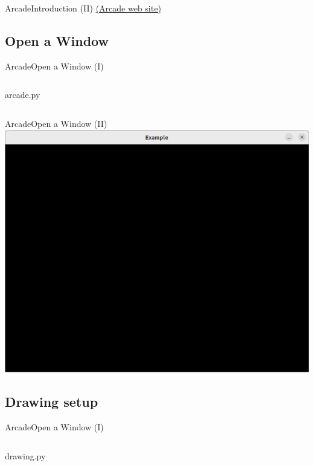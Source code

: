 \documentclass[10pt,compress]{beamer} %
\begin{document}
\begin{frame}{Arcade}{Introduction (II)}
    \href{http://arcade.academy}{(Arcade web site)}
\end{frame}

\subsection{Open a Window}
\begin{frame}{Arcade}{Open a Window (I)}
	\begin{columns}
		\vspace{-0.2cm}
		\begin{exampleblock}{arcade.py}
		\vspace{-0.2cm}
		
		\vspace{-0.2cm}
		\end{exampleblock}
	\end{columns}
\end{frame}

\begin{frame}{Arcade}{Open a Window (II)}
	\centering \includegraphics[width=0.5\linewidth]{figs/window.png}
\end{frame}

\subsection{Drawing setup}
\begin{frame}{Arcade}{Open a Window (I)}
	\begin{columns}
 	   \column{0.80\textwidth}
		\vspace{-0.2cm}
		\begin{exampleblock}{drawing.py}
		\vspace{-0.2cm}
		
		\vspace{-0.2cm}
		\end{exampleblock}
	\end{columns}
\end{frame}
\end{document}
